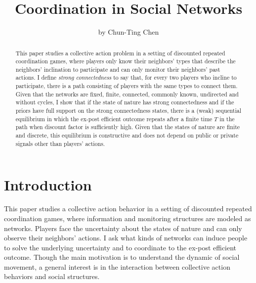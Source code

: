 \documentclass[12pt,letter]{article}
\theoremstyle{definition}
\theoremstyle{remark}
\theoremstyle{claim}
\begin{document}

\title {Coordination in Social Networks}
\author {by Chun-Ting Chen}

\maketitle

\begin{abstract}

This paper studies a collective action problem in a setting of discounted repeated coordination games, where players only know their neighbors' types that describe the neighbors' inclination to participate and can only monitor their neighbors' past actions. I define \textit{strong connectedness} to say that, for every two players who incline to participate, there is a path consisting of players with the same types to connect them. Given that the networks are fixed, finite, connected, commonly known, undirected and without cycles, I show that if the state of nature has strong connectedness and if the priors have full support on the strong connectedness states, there is a (weak) sequential equilibrium in which the ex-post efficient outcome repeats after a finite time $T$ in the path when discount factor is sufficiently high. Given that the states of nature are finite and discrete, this equilibrium is constructive and does not depend on public or private signals other than players' actions.




\end{abstract}


\section{Introduction} 

This paper studies a collective action behavior in a setting of discounted repeated coordination games, where information and monitoring structures are modeled as networks. Players face the uncertainty about the states of nature and can only observe their neighbors' actions. I ask what kinds of networks can induce people to solve the underlying uncertainty and to coordinate to the ex-post efficient outcome. Though the main motivation is to understand the dynamic of social movement, a general interest is in the interaction between collective action behaviors and social structures.
\end{document}
